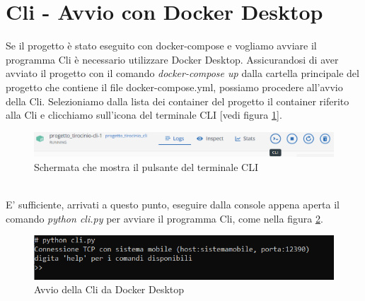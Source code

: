 \section{Cli - Avvio con Docker Desktop}
Se il progetto è stato eseguito con docker-compose e vogliamo avviare il programma Cli è necessario utilizzare Docker Desktop. Assicurandosi di aver avviato il progetto con il comando \textit{docker-compose up} dalla cartella principale del progetto che contiene il file docker-compose.yml, possiamo procedere all'avvio della Cli. Selezioniamo dalla lista dei container del progetto il container riferito alla Cli e clicchiamo sull'icona del terminale CLI [vedi figura \ref{fig: docker_2 }].
\begin{figure}[!h]
\centering
\includegraphics[scale=0.7]{images/docker_2.png}
\caption{Schermata che mostra il pulsante del terminale CLI}
\label{fig: docker_2 }
\end{figure}\\
E' sufficiente, arrivati a questo punto, eseguire dalla console appena aperta il comando \textit{python cli.py} per avviare il programma Cli, come nella figura \ref{fig: docker_3 }.
\begin{figure}[h]
\centering
\includegraphics[scale=0.9]{images/docker_3.png}
\caption{Avvio della Cli da Docker Desktop}
\label{fig: docker_3 }
\end{figure}
